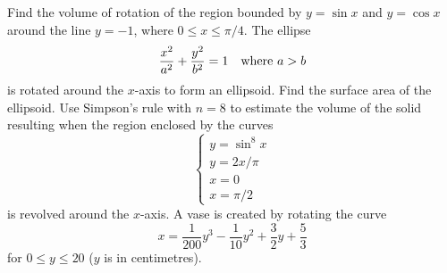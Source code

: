 \begin{questions}
  \questioE Find the volume of rotation of the region bounded by $ y = \sin x $ and $ y = \cos x $ around the line $ y = -1 $,
            where $ 0 \leq x \leq \pi/4 $.
  \questioM The ellipse
            \begin{displaymath}
              \frac{x^2}{a^2} + \frac{y^2}{b^2} = 1 \quad\text{where $ a > b $}
            \end{displaymath}
            is rotated around the $ x$-axis to form an ellipsoid. Find the surface area of the ellipsoid.
  \questioM Use Simpson's rule with $ n = 8 $ to estimate the volume of the solid resulting when the region enclosed by the curves
            \begin{displaymath}
            \begin{cases}
             y = \sin^8 x\\
             y = 2x/\pi\\
             x = 0\\
             x = \pi/2
            \end{cases}
            \end{displaymath}
            is revolved around the $ x$-axis.
  \questioS A vase is created by rotating the curve
            \begin{displaymath}
              x = \frac{1}{200} y^3 - \frac{1}{10} y^2 + \frac{3}{2} y + \frac{5}{3}
            \end{displaymath}
            for $ 0 \leq y \leq 20 $ ($ y $ is in centimetres).
    \begin{parts}

\end{parts}
\end{questions}
